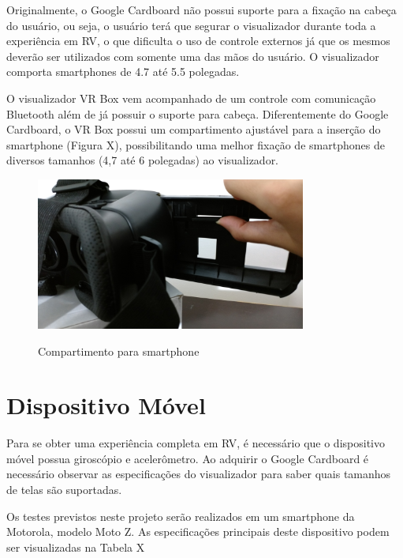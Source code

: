 Originalmente, o Google Cardboard não possui suporte para a fixação na cabeça do usuário, ou seja, o usuário terá que segurar o visualizador durante toda a experiência em RV, o que dificulta o uso de controle externos já que os mesmos deverão ser utilizados com somente uma das mãos do usuário. O visualizador comporta smartphones de 4.7 até 5.5 polegadas.

O visualizador VR Box vem acompanhado de um controle com comunicação Bluetooth além de já possuir o suporte para cabeça. Diferentemente do Google Cardboard, o VR Box possui um compartimento ajustável para a inserção do smartphone (Figura X), possibilitando uma melhor fixação de smartphones de diversos tamanhos (4,7 até 6 polegadas) ao visualizador.

\begin{figure}[H]
	\caption{\small Compartimento para smartphone}
	\centering
	\includegraphics[height=5cm]{Imagens/extensor.jpg}
	\label{f.extensor}
\end{figure}



\section{Dispositivo Móvel}
\label{s.dispositivomovel}

Para se obter uma experiência completa em RV, é necessário que o dispositivo móvel possua giroscópio e acelerômetro. Ao adquirir o Google Cardboard é necessário observar as especificações do visualizador para saber quais tamanhos de telas são suportadas. 

Os testes previstos neste projeto serão realizados em um smartphone da Motorola, modelo Moto Z. As especificações principais deste dispositivo podem ser visualizadas na Tabela X



